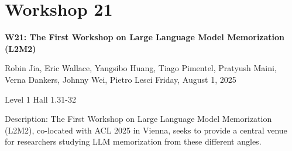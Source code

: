 \clearpage


\section[W21: The First Workshop on Large Language Model Memorization (L2M2)]{Workshop 21}

\begin{center}
    {\Large \textbf{W21: The First Workshop on Large Language Model Memorization (L2M2)}}

Robin Jia, Eric Wallace, Yangsibo Huang, Tiago Pimentel, Pratyush Maini, Verna Dankers, Johnny Wei, Pietro Lesci
    Friday, August 1, 2025

    Level 1 Hall 1.31-32
    
\end{center}

Description: The First Workshop on Large Language Model Memorization (L2M2), co-located with ACL 2025 in Vienna, seeks to provide a central venue for researchers studying LLM memorization from these different angles.

